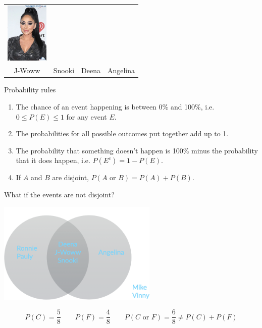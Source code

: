 \documentclass{beamer}\usepackage[]{graphicx}\usepackage[]{color}
\begin{document}
\begin{darkframes}
\begin{frame}{}
\begin{center}
\begin{tabular}{cccc}
          \includegraphics[width=0.8in]{angelina} \\
          J-Woww & Snooki & Deena & Angelina \\
        \end{tabular}
      \end{center}
    \end{frame}

    \begin{frame}{Probability rules}
      \begin{enumerate}
        \item The chance of an event happening is between 0\% and 100\%, i.e. $0 \leq P(E) \leq 1$ for any event $E$.
        \item The probabilities for all possible outcomes put together add up to 1.
        \item The probability that something doesn’t happen is 100\% minus the probability that it does happen, i.e. $P(E^c) = 1-P(E)$.
        \item If $A$ and $B$ are disjoint, $P(\text{$A$ or $B$}) = P(A)+P(B)$.
      \end{enumerate}
    \end{frame}

    \begin{frame}{What if the events are not disjoint?}
      \begin{center}
        \includegraphics[width=3in]{venn}
      \end{center}
      
      \[
        P(C) = \frac 5 8 \qquad P(F) = \frac 4 8 
        \qquad P(\text{$C$ or $F$}) = \frac 6 8 \neq P(C) + P(F)
      \]
    \end{frame}


\end{darkframes}
\end{document}
